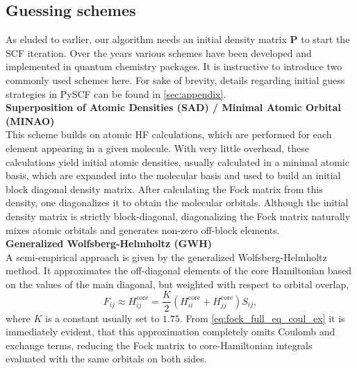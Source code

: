 \subsection{Guessing schemes}
\label{subsec:background_hf_guessing}
As eluded to earlier, our algorithm needs an initial density matrix $\mathbf{P}$ to start the SCF iteration. Over the years various schemes have been developed and implemented in quantum chemistry packages. It is instructive to introduce two commonly used schemes here. For sake of brevity, details regarding initial guess strategies in PySCF can be found in \autoref{sec:appendix}.\\

\textbf{Superposition of Atomic Densities (SAD) / Minimal Atomic Orbital (MINAO)}\\
This scheme builds on atomic HF calculations, which are performed for each element appearing in a given molecule. With very little overhead, these calculations yield initial atomic densities, usually calculated in a minimal atomic basis, which are expanded into the molecular basis and used to build an initial block diagonal density matrix. After calculating the Fock matrix from this density, one diagonalizes it to obtain the molecular orbitals. Although the initial density matrix is strictly block-diagonal, diagonalizing the Fock matrix naturally mixes atomic orbitals and generates non-zero off-block elements. \parencite{ref:sad_guess}\\

\textbf{Generalized Wolfsberg-Helmholtz (GWH)}\\
A semi-empirical approach is given by the generalized Wolfsberg-Helmholtz method. It approximates the off-diagonal elements of the core Hamiltonian based on the values of the main diagonal, but weighted with respect to orbital overlap,
\begin{equation}
    \label{eq:gwh}
    F_{ij} \approx H^{\text{core}}_{ij} = \frac{K}{2}(H^{\text{core}}_{ii} + H^{\text{core}}_{jj})S_{ij},
\end{equation}
where $K$ is a constant usually set to $1.75$. From \autoref{eq:fock_full_eq_coul_ex} it is immediately evident, that this approximation completely omits Coulomb and exchange terms, reducing the Fock matrix to core-Hamiltonian integrals evaluated with the same orbitals on both sides. \parencite{ref:gwh_wolfsberg1952spectra, ref:Lehtola2019}

